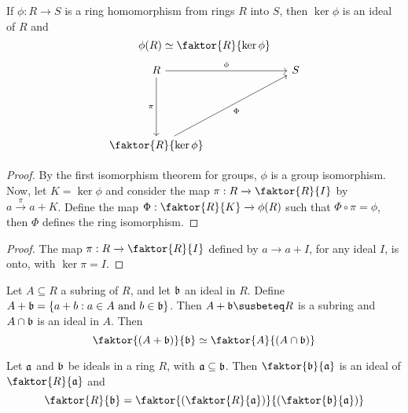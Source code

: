 \begin{theorem}\label{theorem_5.3.4}
  If $\phi:R \xrightarrow{} S$ is a ring homomorphism from rings $R$ into $S$,
  then $\ker{\phi}$ is an ideal of $R$ and
  \begin{equation*}
    \phi(R) \simeq \faktor{R}{\ker{\phi}}
  \end{equation*}
  \[\begin{tikzcd}
    R &&& S \\
    \\
    \\
    {\faktor{R}{\ker{\phi}}}
    \arrow["\pi"', from=1-1, to=4-1]
    \arrow["\phi", from=1-1, to=1-4]
    \arrow["{\Phi}"', from=4-1, to=1-4]
  \end{tikzcd}\]
\end{theorem}
\begin{proof}
  By the first isomorphism theorem for groups, $\phi$ is a group isomorphism.
  Now, let $K=\ker{\phi}$ and consider the map $\pi:R \xrightarrow{}
  \faktor{R}{I}$ by $a \xrightarrow{\pi} a+K$. Define the map
  $\Phi:\faktor{R}{K} \xrightarrow{} \phi(R)$ such that $\Phi
  \circ \pi=\phi$, then $\Phi$ defines the ring isomorphism.
\end{proof}
\begin{proof}
  The map $\pi:R \xrightarrow{} \faktor{R}{I}$ defined by $a \xrightarrow{}
  a+I$, for any ideal $I$, is onto, with  $\ker{\pi}=I$.
\end{proof}

\begin{theorem}\label{theorem_5.3.5}
  Let $A \subseteq R$ a subring of  $R$, and let $\bf$ an ideal in $R$. Define
  $A+\bf=\{a+b : a \in A \text{ and } b \in \bf\}$. Then $A+\bf \susbeteq R$ is a
  subring and  $A \cap \bf$ is an ideal in $A$. Then
  \begin{equation*}
    \faktor{(A+\bf)}{\bf} \simeq \faktor{A}{(A \cap \bf)}
  \end{equation*}
\end{theorem}

\begin{theorem}\label{theorem_5.3.6}
  Let $\af$ and  $\bf$ be ideals in a ring  $R$, with  $\af \subseteq \bf$.
  Then
  $\faktor{\bf}{\af}$ is an ideal of $\faktor{R}{\af}$ and
  \begin{equation*}
    \faktor{R}{\bf}=\faktor{(\faktor{R}{\af})}{(\faktor{\bf}{\af})}
  \end{equation*}
\end{theorem}

